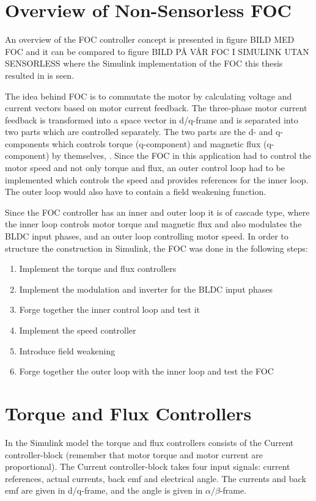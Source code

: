 \documentclass{LTHthesis}
\begin{document}
\section{Overview of Non-Sensorless FOC}
An overview of the FOC controller concept is presented in figure BILD MED FOC and it can be compared to figure BILD PÅ VÅR FOC I SIMULINK UTAN SENSORLESS where the Simulink implementation of the FOC this thesis resulted in is seen.

The idea behind FOC is to commutate the motor by calculating voltage and current vectors based on motor current feedback. The three-phase motor current feedback is transformed into a space vector in d/q-frame and is separated into two parts which are controlled separately. The two parts are the d- and q-components which controls torque (q-component) and magnetic flux (q-component) by themselves, \cite{lee_lem_keo}. Since the FOC in this application had to control the motor speed and not only torque and flux, an outer control loop had to be implemented which controls the speed and provides references for the inner loop. The outer loop would also have to contain a field weakening function.

Since the FOC controller has an inner and outer loop it is of cascade type, where the inner loop controls motor torque and magnetic flux and also modulates the BLDC input phases, and an outer loop controlling motor speed. In order to structure the construction in Simulink, the FOC was done in the following steps:
\begin{enumerate}
\item Implement the torque and flux controllers
\item Implement the modulation and inverter for the BLDC input phases
\item Forge together the inner control loop and test it
\item Implement the speed controller 
\item Introduce field weakening
\item Forge together the outer loop with the inner loop and test the FOC
\end{enumerate}
\section{Torque and Flux Controllers}
In the Simulink model the torque and flux controllers consists of the Current controller-block (remember that motor torque and motor current are proportional). The Current controller-block takes four input signals: current references, actual currents, back emf and electrical angle. The currents and back emf are given in d/q-frame, and the angle is given in $\alpha/\beta$-frame.
\end{document}
